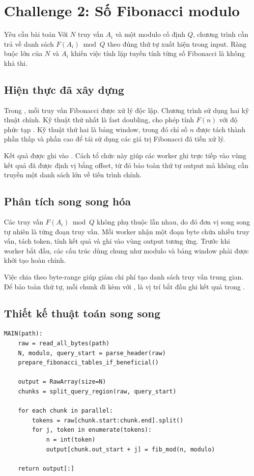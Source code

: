 \section{Challenge 2: Số Fibonacci modulo}
\label{sec:challenge2}

\begin{requirementbox}{Yêu cầu bài toán}
Với $N$ truy vấn $A_i$ và một modulo cố định $Q$, chương trình cần trả về danh sách $F(A_i) \bmod Q$ theo đúng thứ tự xuất hiện trong input. Ràng buộc lớn của $N$ và $A_i$ khiến việc tính lặp tuyến tính từng số Fibonacci là không khả thi.
\end{requirementbox}

\subsection{Hiện thực đã xây dựng}
Trong , mỗi truy vấn Fibonacci được xử lý độc lập. Chương trình sử dụng hai kỹ thuật chính. Kỹ thuật thứ nhất là fast doubling, cho phép tính $F(n)$ với độ phức tạp . Kỹ thuật thứ hai là bảng window, trong đó chỉ số $n$ được tách thành phần thấp và phần cao để tái sử dụng các giá trị Fibonacci đã tiền xử lý.

Kết quả được ghi vào . Cách tổ chức này giúp các worker ghi trực tiếp vào vùng kết quả đã được định vị bằng offset, từ đó bảo toàn thứ tự output mà không cần truyền một danh sách lớn về tiến trình chính.

\subsection{Phân tích song song hóa}
Các truy vấn $F(A_i) \bmod Q$ không phụ thuộc lẫn nhau, do đó đơn vị song song tự nhiên là từng đoạn truy vấn. Mỗi worker nhận một đoạn byte chứa nhiều truy vấn, tách token, tính kết quả và ghi vào vùng output tương ứng. Trước khi worker bắt đầu, các cấu trúc dùng chung như modulo và bảng window phải được khởi tạo hoàn chỉnh.

Việc chia theo byte-range giúp giảm chi phí tạo danh sách truy vấn trung gian. Để bảo toàn thứ tự, mỗi chunk đi kèm với , là vị trí bắt đầu ghi kết quả trong .

\subsection{Thiết kế thuật toán song song}
\begin{lstlisting}[caption={Pseudocode song song cho Challenge 2}]
MAIN(path):
    raw = read_all_bytes(path)
    N, modulo, query_start = parse_header(raw)
    prepare_fibonacci_tables_if_beneficial()

    output = RawArray(size=N)
    chunks = split_query_region(raw, query_start)

    for each chunk in parallel:
        tokens = raw[chunk.start:chunk.end].split()
        for j, token in enumerate(tokens):
            n = int(token)
            output[chunk.out_start + j] = fib_mod(n, modulo)

    return output[:]
\end{lstlisting}

